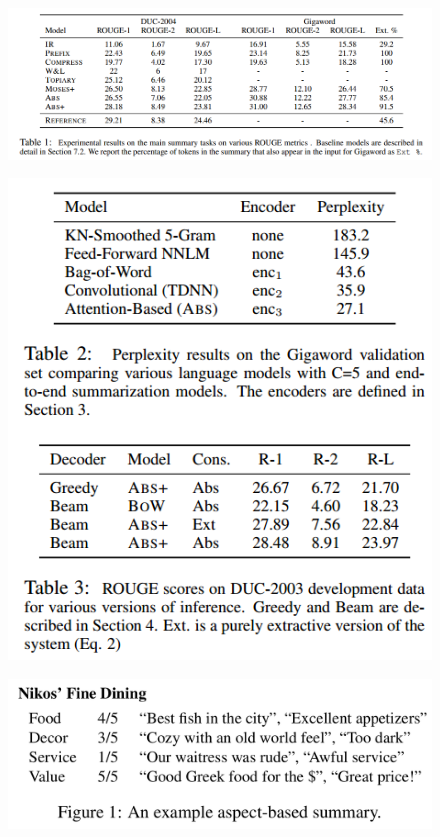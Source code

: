 \documentclass[xcolor={table}]{beamer}
\begin{document}
\begin{frame}{\cite{rush2015neural}}
\begin{figure}[h]
\centering
\includegraphics[scale=.3]{images/table1-rush15} \\
\end{figure}
\end{frame}

\begin{frame}{\cite{rush2015neural}}
\begin{figure}[h]
\centering
\includegraphics[scale=.3]{images/table2-rush15} \\
\end{figure}
\end{frame}

\begin{frame}{\cite{titov2008joint}}
\begin{figure}[h]
\centering
\includegraphics[scale=.3]{images/figure1-titov08} \\
\end{figure}
\end{frame}
\end{document}
